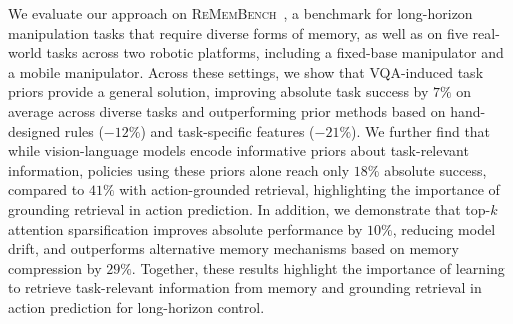 We evaluate our approach on \textsc{ReMemBench}~\cite{anonymous2026scaling}, a benchmark for long-horizon manipulation tasks that require diverse forms of memory, as well as on five real-world tasks across two robotic platforms, including a fixed-base manipulator and a mobile manipulator.
Across these settings, we show that VQA-induced task priors provide a general solution, improving absolute task success by $7\%$ on average across diverse tasks and outperforming prior methods based on hand-designed rules ($-12\%$) and task-specific features ($-21\%$).
We further find that while vision-language models encode informative priors about task-relevant information, policies using these priors alone reach only $18\%$ absolute success, compared to $41\%$ with action-grounded retrieval, highlighting the importance of grounding retrieval in action prediction.
In addition, we demonstrate that top-$k$ attention sparsification improves absolute performance by $10\%$, reducing model drift, and outperforms alternative memory mechanisms based on memory compression by $29\%$.
Together, these results highlight the importance of learning to retrieve task-relevant information from memory and grounding retrieval in action prediction for long-horizon control.



